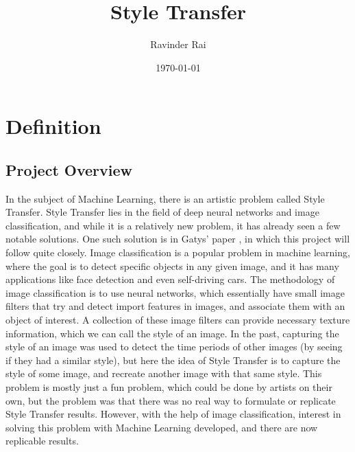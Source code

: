\documentclass[12pt]{article}
\title{\textbf{Style Transfer}}
\author{Ravinder Rai}
\date{\today}
\begin{document}
 


\begin{titlepage}
\centering

\maketitle

\end{titlepage}

\newpage
\section{Definition}
\subsection{Project Overview}
In the subject of Machine Learning, there is an artistic problem called Style Transfer. Style Transfer lies in the field of deep neural networks and image classification, and while it is a relatively new problem, it has already seen a few notable solutions. One such solution is in Gatys' paper \cite{Neural}, in which this project will follow quite closely. Image classification is a popular problem in machine learning, where the goal is to detect specific objects in any given image, and it has many applications like face detection and even self-driving cars. The methodology of image classification is to use neural networks, which essentially have small image filters that try and detect import features in images, and associate them with an object of interest. A collection of these image filters can provide necessary texture information, which we can call the style of an image. In the past, capturing the style of an image was used to detect the time periods of other images (by seeing if they had a similar style), but here the idea of Style Transfer is to capture the style of some image, and recreate another image with that same style. This problem is mostly just a fun problem, which could be done by artists on their own, but the problem was that there was no real way to formulate or replicate Style Transfer results. However, with the help of image classification, interest in solving this problem with Machine Learning developed, and there are now replicable results.
\end{document}
